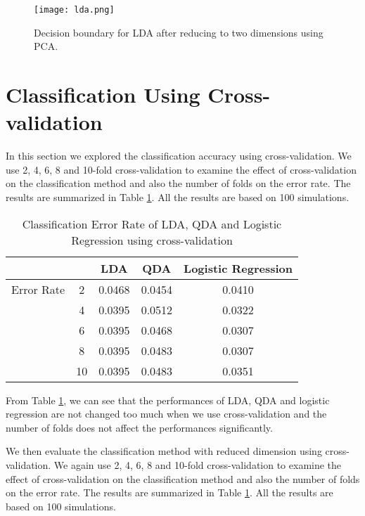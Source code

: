 \documentclass[12pt]{article}
\begin{document}
\begin{figure}[tb]
	\centering
	\texttt{[image: lda.png]}
	\caption{Decision boundary for LDA after reducing to two dimensions using PCA.}
	\label{fig:lda}
\end{figure}

\section{Classification Using Cross-validation}
In this section we explored the classification accuracy using cross-validation. We use 2, 4, 6, 8 and 10-fold cross-validation to examine the effect of cross-validation on the classification method and also the number of folds on the error rate. The results are summarized in Table \ref{tab4}. All the results are based on 100 simulations. 
\begin{table}[htbp]
	\begin{center}
		\caption{\label{tab4} Classification Error Rate of LDA, QDA and Logistic Regression using cross-validation}
		\begin{tabular}{c|c|ccc}
			\hline
			&&LDA &QDA &Logistic Regression \\
            \hline
            Error Rate& 2&0.0468 &0.0454 &0.0410  \\ 
           \hline
	       &4 &0.0395 &0.0512 &0.0322  \\ 
		     \hline
		  &6 &0.0395 &0.0468 &0.0307  \\
		    \hline
		&8 &0.0395 &0.0483 &0.0307  \\
			\hline
		&10 &0.0395 &0.0483 &0.0351  \\
			\hline
		\end{tabular}
	\end{center}
\end{table}

From Table \ref{tab4}, we can see that the performances of LDA, QDA and logistic regression are not changed too much when we use cross-validation and the number of folds does not affect the performances significantly.


We then evaluate the classification method with reduced dimension using cross-validation. We again use 2, 4, 6, 8 and 10-fold cross-validation to examine the effect of cross-validation on the classification method and also the number of folds on the error rate. The results are summarized in Table \ref{tab4}. All the results are based on 100 simulations. 
\end{document}
